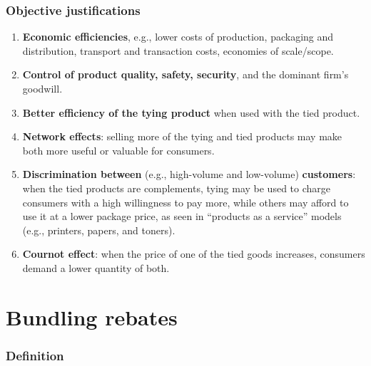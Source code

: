         \subsubsection{Objective justifications}

            \begin{enumerate}
                \item \textbf{Economic efficiencies}, e.g., lower costs of production, packaging and distribution, transport and transaction costs, economies of scale/scope.
                \item \textbf{Control of product quality, safety, security}, and the dominant firm’s goodwill.
                \item \textbf{Better efficiency of the tying product} when used with the tied product.
                \item \textbf{Network effects}: selling more of the tying and tied products may make both more useful or valuable for consumers.
                \item \textbf{Discrimination between} (e.g., high-volume and low-volume) \textbf{customers}: when the tied products are complements, tying may be used to charge consumers with a high willingness to pay more, while others may afford to use it at a lower package price, as seen in “products as a service” models (e.g., printers, papers, and toners).
                \item \textbf{Cournot effect}: when the price of one of the tied goods increases, consumers demand a lower quantity of both.
            \end{enumerate}

\section{Bundling rebates}

        \subsubsection{Definition}


